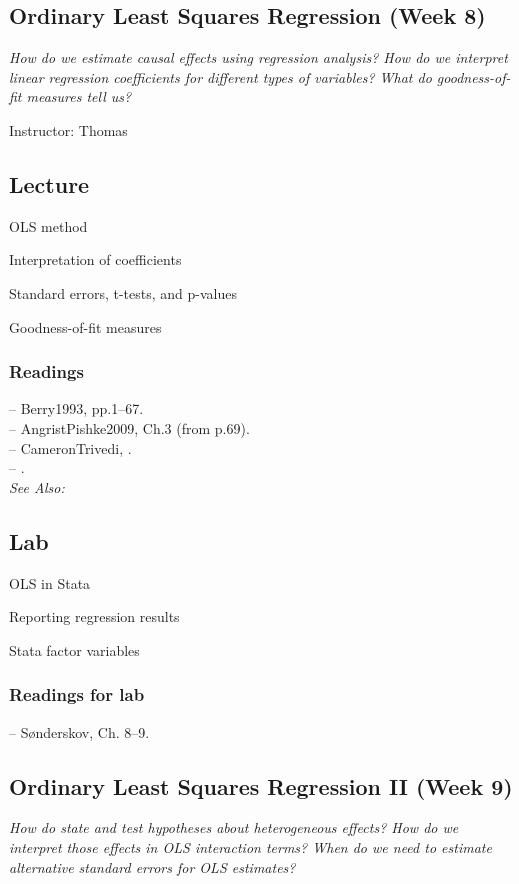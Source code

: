 \documentclass[11pt,a4paper]{article}
\newcommand{\reading}[2][]{\noindent -- {#1}\bibentry{#2}.\vspace{.25em}\\}
\newcommand{\textbook}[2][]{\noindent -- {#2}, {#1}.\vspace{.25em}\\}
\newcommand{\thomas}{\vspace{1em}\noindent Instructor: Thomas\vspace{1em}\\}
\newcommand{\seealso}{\noindent \emph{See Also:}\\}
\begin{document}
\clearpage
\subsection{Ordinary Least Squares Regression (Week 8)}
\emph{How do we estimate causal effects using regression analysis? How do we interpret linear regression coefficients for different types of variables? What do goodness-of-fit measures tell us?}

\thomas

\subsection*{Lecture}

\begin{itemize*}
\item OLS method
\item Interpretation of coefficients
\item Standard errors, t-tests, and p-values
\item Goodness-of-fit measures
\end{itemize*}

\subsubsection*{Readings}
\textbook[pp.1--67]{Berry1993}
\textbook[Ch.3 (from p.69)]{AngristPishke2009}
\textbook{CameronTrivedi}
\reading{Englebert2000}


\seealso

\subsection*{Lab}
\begin{itemize*}
\item OLS in Stata
\item Reporting regression results
\item Stata factor variables
\end{itemize*}


\subsubsection*{Readings for lab}
\textbook[Ch. 8--9]{S{\o}nderskov}




\clearpage
\subsection{Ordinary Least Squares Regression II (Week 9)}
\emph{How do state and test hypotheses about heterogeneous effects? How do we interpret those effects in OLS interaction terms? When do we need to estimate alternative standard errors for OLS estimates?}
\end{document}
